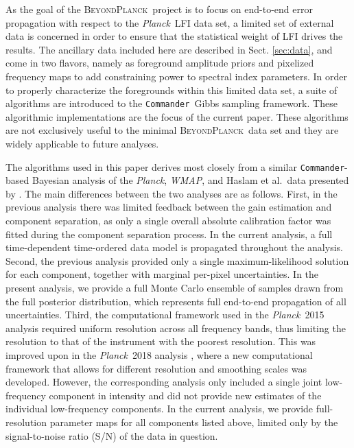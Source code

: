 \documentclass{aa}
\def\Planck{\textit{Planck}}
\def\WMAP{\emph{WMAP}}
\def\commander{\texttt{Commander}}
\newcommand{\BP}{\textsc{BeyondPlanck}}
\begin{document}
As the goal of the \BP\ project is to focus on end-to-end error
propagation with respect to the \Planck\ LFI data set, a limited set of
external data is concerned in order to ensure that the statistical weight
of LFI drives the results. The ancillary data included here are described
in Sect. \ref{sec:data}, and come in two flavors, namely as foreground 
amplitude priors and pixelized frequency maps to add constraining power to spectral index parameters.
In order to properly characterize the foregrounds within this limited data set,
a suite of algorithms are introduced to the \commander\ Gibbs sampling framework.
These algorithmic implementations are the focus of the current paper.
These algorithms are not exclusively useful to the minimal \BP\ data set
and they are widely applicable to future analyses.

The algorithms used in this paper derives most closely from a similar
\commander-based \citep{eriksen:2004,eriksen2008} Bayesian analysis of
the \Planck, \WMAP, and Haslam et al.\ data presented by
\citet{planck2014-a11}. The main differences between the two analyses
are as follows. First, in the previous analysis there was limited
feedback between the gain estimation and component separation, as only
a single overall absolute calibration factor was fitted during the
component separation process. In the current analysis, a full
time-dependent time-ordered data model is propagated throughout the
analysis. Second, the previous analysis provided only a single maximum-likelihood solution for each component, together with marginal
per-pixel uncertainties. In the present analysis, we provide a full
Monte Carlo ensemble of samples drawn from the full posterior
distribution, which represents full end-to-end propagation of all
uncertainties. Third, the computational framework used in the
\Planck\ 2015 analysis required uniform resolution across all
frequency bands, thus limiting the resolution to that of the
instrument with the poorest resolution. This was improved upon in the
\Planck\ 2018 analysis \citep{planck2016-l04}, where a new
computational framework that allows for different resolution and
smoothing scales was developed. However, the corresponding analysis
only included a single joint low-frequency component in intensity and
did not provide new estimates of the individual low-frequency
components. In the current analysis, we provide full-resolution
parameter maps for all components listed above, limited only by the
signal-to-noise ratio (S/N) of the data in question.
\end{document}
